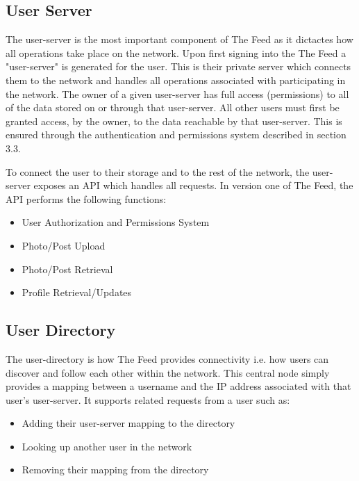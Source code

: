 \documentclass[pageno]{jpaper}
\begin{document}
\begin{multicols*}{2}
\subsection{User Server}
\label{section:userserver}

The user-server is the most important component of The Feed as it dictactes how all operations take place on the network. Upon first signing into the The Feed a "user-server" is generated for the user. This is their private server which connects them to the network and handles all operations associated with participating in the network. The owner of a given user-server has full access (permissions) to all of the data stored on or through that user-server. All other users must first be granted access, by the owner, to the data reachable by that user-server. This is ensured through the authentication and permissions system described in section 3.3.\par
To connect the user to their storage and to the rest of the network, the user-server exposes an API which handles all requests. In version one of The Feed, the API performs the following functions:\newline

\begin{center}
	\begin{itemize}
		\setlength{\itemsep}{2\baselineskip}
		\item User Authorization and Permissions System
		\item Photo/Post Upload
		\item Photo/Post Retrieval
		\item Profile Retrieval/Updates
	\end{itemize}
\end{center}

\subsection{User Directory}
\label{section:userdirectory}

The user-directory is how The Feed provides connectivity i.e. how users can discover and follow each other within the network. This central node simply provides a mapping between a username and the IP address associated with that user's user-server. It supports related requests from a user such as:\newline	

\begin{center}
	\begin{itemize}
		\setlength{\itemsep}{2\baselineskip}
		\item Adding their user-server mapping to the directory
		\item Looking up another user in the network
		\item Removing their mapping from the directory\newline
	\end{itemize}
\end{center}	


\end{multicols*}
\end{document}

